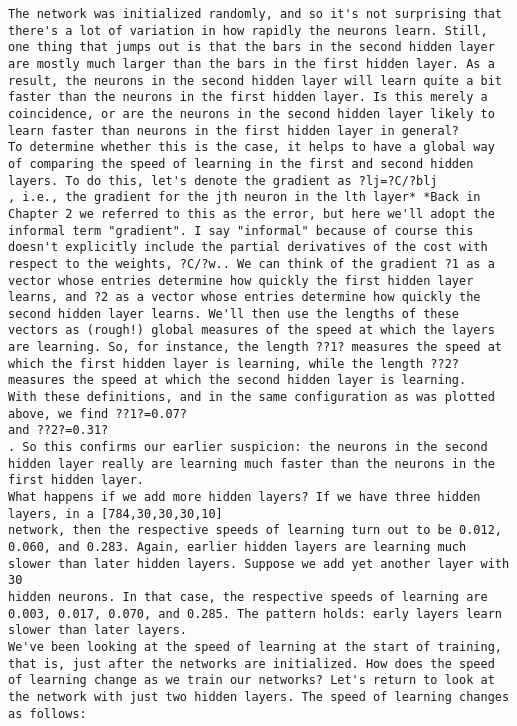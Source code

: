 \begin{lstlisting}
The network was initialized randomly, and so it's not surprising that there's a lot of variation in how rapidly the neurons learn. Still, one thing that jumps out is that the bars in the second hidden layer are mostly much larger than the bars in the first hidden layer. As a result, the neurons in the second hidden layer will learn quite a bit faster than the neurons in the first hidden layer. Is this merely a coincidence, or are the neurons in the second hidden layer likely to learn faster than neurons in the first hidden layer in general?
To determine whether this is the case, it helps to have a global way of comparing the speed of learning in the first and second hidden layers. To do this, let's denote the gradient as ?lj=?C/?blj
, i.e., the gradient for the jth neuron in the lth layer* *Back in Chapter 2 we referred to this as the error, but here we'll adopt the informal term "gradient". I say "informal" because of course this doesn't explicitly include the partial derivatives of the cost with respect to the weights, ?C/?w.. We can think of the gradient ?1 as a vector whose entries determine how quickly the first hidden layer learns, and ?2 as a vector whose entries determine how quickly the second hidden layer learns. We'll then use the lengths of these vectors as (rough!) global measures of the speed at which the layers are learning. So, for instance, the length ??1? measures the speed at which the first hidden layer is learning, while the length ??2?
measures the speed at which the second hidden layer is learning.
With these definitions, and in the same configuration as was plotted above, we find ??1?=0.07?
and ??2?=0.31?
. So this confirms our earlier suspicion: the neurons in the second hidden layer really are learning much faster than the neurons in the first hidden layer.
What happens if we add more hidden layers? If we have three hidden layers, in a [784,30,30,30,10]
network, then the respective speeds of learning turn out to be 0.012, 0.060, and 0.283. Again, earlier hidden layers are learning much slower than later hidden layers. Suppose we add yet another layer with 30
hidden neurons. In that case, the respective speeds of learning are 0.003, 0.017, 0.070, and 0.285. The pattern holds: early layers learn slower than later layers.
We've been looking at the speed of learning at the start of training, that is, just after the networks are initialized. How does the speed of learning change as we train our networks? Let's return to look at the network with just two hidden layers. The speed of learning changes as follows:


\end{lstlisting}
